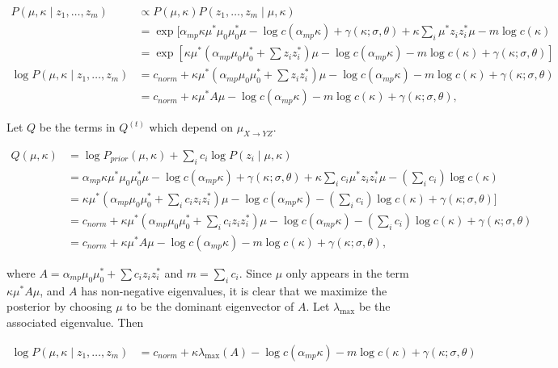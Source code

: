 \begin{align*}
P(\mu, \kappa \mid z_1,\dots,z_m) &\propto
P(\mu, \kappa) P(z_1,\dots,z_m\mid \mu, \kappa) \\
&= \exp[ \alpha_{mp}\kappa \mu^* \mu_0 \mu_0^* \mu
- \log c(\alpha_{mp} \kappa) + \gamma(\kappa; \sigma,\theta)
+ \kappa \sum_i \mu^* z_i z_i^* \mu - m \log c(\kappa)
\\
&= \exp[
\kappa \mu^* (\alpha_{mp} \mu_0 \mu_0^* + \sum z_i z_i^*)\mu
- \log c(\alpha_{mp} \kappa) - m \log c(\kappa) + 
\gamma(\kappa; \sigma, \theta) ]\\
\log P(\mu, \kappa \mid z_1,\dots,z_m) &= 
c_{norm} + 
\kappa \mu^* (\alpha_{mp} \mu_0 \mu_0^* + \sum z_i z_i^*)\mu
- \log c(\alpha_{mp} \kappa) - m \log c(\kappa) + 
\gamma(\kappa; \sigma, \theta) \\
&= c_{norm} + 
\kappa \mu^* A \mu
- \log c(\alpha_{mp} \kappa) - m \log c(\kappa) + 
\gamma(\kappa; \sigma, \theta),
\end{align*}

Let $Q$ be the terms in $Q^{(t)}$ which depend on $\mu_{X\to YZ}$.

\begin{align*}
Q(\mu, \kappa) &=
\log P_{prior}(\mu, \kappa) + \sum_i c_i \log P(z_i\mid \mu, \kappa) \\
&= \alpha_{mp}\kappa \mu^* \mu_0 \mu_0^* \mu
- \log c(\alpha_{mp} \kappa) + \gamma(\kappa; \sigma,\theta)
+ \kappa \sum_i c_i \mu^* z_i z_i^* \mu - (\sum_i c_i) \log c(\kappa)
\\
&= 
\kappa \mu^* (\alpha_{mp} \mu_0 \mu_0^* + \sum_i c_i z_i z_i^*)\mu
- \log c(\alpha_{mp} \kappa) - (\sum_i c_i) \log c(\kappa) + 
\gamma(\kappa; \sigma, \theta) ]\\
&=
c_{norm} + 
\kappa \mu^* (\alpha_{mp} \mu_0 \mu_0^* + \sum_i c_i z_i z_i^*)\mu
- \log c(\alpha_{mp} \kappa) - (\sum_i c_i) \log c(\kappa) + 
\gamma(\kappa; \sigma, \theta) \\
&= c_{norm} + 
\kappa \mu^* A \mu
- \log c(\alpha_{mp} \kappa) - m \log c(\kappa) + 
\gamma(\kappa; \sigma, \theta),
\end{align*}

where $A = \alpha_{mp} \mu_0 \mu_0^* + \sum c_i z_i z_i^*$ and $m =
\sum_i c_i$.  Since $\mu$ only appears in the term $\kappa \mu^* A
\mu$, and $A$ has non-negative eigenvalues, it is clear that we
maximize the posterior by choosing $\mu$ to be the dominant
eigenvector of $A$.  Let $\lambda_{\max}$ be the associated
eigenvalue. Then

\begin{align*}
\log P(\mu, \kappa \mid z_1,\dots,z_m) &= 
c_{norm} + \kappa \lambda_{\max}(A) - 
\log c(\alpha_{mp} \kappa) - m \log c(\kappa) + 
\gamma(\kappa; \sigma, \theta)\\
\end{align*}

